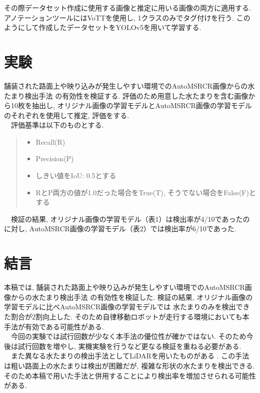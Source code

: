 \documentclass[10pt]{jarticle}
\begin{document}
    その際データセット作成に使用する画像と推定に用いる画像の両方に適用する. 
    アノテーションツールにはVoTTを使用し, 1クラスのみでタグ付けを行う. 
    このようにして作成したデータセットをYOLOv5を用いて学習する. 


    \section{実験}%
    舗装された路面上や映り込みが発生しやすい環境でのAutoMSRCR画像からの水たまり検出手法
    の有効性を検証する. 
    評価のため用意した水たまりを含む画像から10枚を抽出し, 
    オリジナル画像の学習モデルとAutoMSRCR画像の学習モデルのそれぞれを使用して推定, 評価をする. \\
    　評価基準は以下のものとする. 
    \begin{quote}
        \begin{itemize}
         \item Recall(R) 
         \item Precision(P) 
         \item しきい値をIoU: 0.5とする
         \item RとP両方の値が1.0だった場合をTrue(T), 
         そうでない場合をFalse(F)とする
         
        \end{itemize}
       \end{quote}
    　検証の結果, オリジナル画像の学習モデル（表1）は検出率が4/10であったのに対し, 
    AutoMSRCR画像の学習モデル（表2）では検出率が6/10であった. 

    \section{結言}%
    本稿では, 舗装された路面上や映り込みが発生しやすい環境でのAutoMSRCR画像からの水たまり検出手法
    の有効性を検証した. 検証の結果, オリジナル画像の学習モデルに比べAutoMSRCR画像の学習モデルでは
    水たまりのみを検出できた割合が2割向上した. 
    そのため自律移動ロボットが走行する環境においても本手法が有効である可能性がある. \\
    　今回の実験では試行回数が少なく本手法の優位性が確かではない.  
    そのため今後は試行回数を増やし, 実機実験を行うなど更なる検証を重ねる必要がある. \\
    　また異なる水たまりの検出手法としてLiDARを用いたものがある\cite{Hirotaka2019} . 
    この手法は粗い路面上の水たまりは検出が困難だが, 複雑な形状の水たまりを検出できる. 
    そのため本稿で用いた手法と併用することにより検出率を増加させられる可能性がある. 
     
\end{document}
